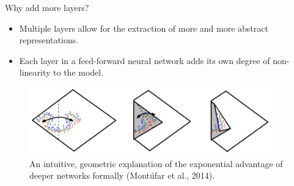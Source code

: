 \documentclass[11pt,compress,t,notes=noshow, xcolor=table]{beamer}
\begin{document}
\begin{vbframe}{Why add more layers?}
\begin{itemize}
\item Multiple layers allow for the extraction of more and more abstract
representations.
\item Each layer in a feed-forward neural network adds its own degree of non-linearity to the model.
\end{itemize}
\begin{figure}
\centering
\includegraphics[width=10.5cm]{figure/folding}
\caption{An intuitive, geometric explanation of the exponential advantage of deeper networks formally (Mont\'{u}far et al., 2014).}
\end{figure}
\end{vbframe}
\end{document}
